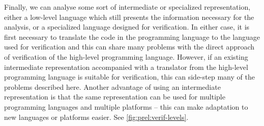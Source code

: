Finally, we can analyse some sort of intermediate or specialized representation, either a low-level language which still presents the information necessary for the analysis, or a specialized language designed for verification.
In either case, it is first necessary to translate the code in the programming language to the language used for verification and this can share many problems with the direct approach of verification of the high-level programming language.
However, if an existing intermediate representation accompanied with a translator from the high-level programming language is suitable for verification, this can side-step many of the problems described here.
Another advantage of using an intermediate representation is that the same representation can be used for multiple programming languages and multiple platforms -- this can make adaptation to new languages or platforms easier.
See \autoref{fig:prel:verif-levels}.

